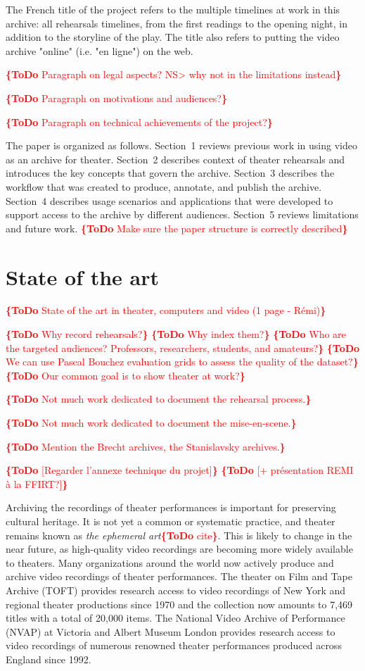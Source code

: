 \documentclass[conference]{IEEEtran}
\newcommand{\todo}[1]{\noindent\textcolor{red}{{\bf \{ToDo} #1{\bf \}}}}
\begin{document}
The French title of the project refers to the multiple timelines at work in this archive: all rehearsals timelines, from the first readings to the opening night, in addition to the storyline of the play. The title also refers to putting the video archive "online" (i.e. "en ligne") on the web.

\todo{Paragraph on legal aspects? NS> why not in the limitations instead} 

\todo{Paragraph on motivations and audiences?}

\todo{Paragraph on technical achievements of the project?}

The paper is organized as follows. Section~1 reviews previous work in using video as an archive for theater. Section~2 describes
context of theater rehearsals and introduces the key concepts that govern the archive. Section~3 describes the workflow that was
created to produce, annotate, and publish the archive. Section~4 describes usage scenarios and applications that were developed
to support access to the archive by different audiences. Section~5 reviews limitations and future work.
\todo{Make sure the paper structure is correctly described}


\section{State of the art}
\todo{State of the art in theater, computers and video (1 page - Rémi)}

\todo{Why record rehearsals?}
\todo{Why index them?}
\todo{Who are the targeted audiences? Professors, researchers, students, and amateurs?}
\todo{We can use Pascal Bouchez evaluation grids to assess the quality of the dataset?}
\todo{Our common goal is to show theater at work?}

\todo{Not much work dedicated to document the rehearsal process.}

\todo{Not much work dedicated to document the mise-en-scene.}

\todo{Mention the Brecht archives, the Stanislavsky archives.}

\todo{[Regarder l'annexe technique du projet]}
\todo{[+ présentation REMI à la FFIRT?]}

Archiving the recordings of theater performances is important for preserving  cultural heritage. 
It is not yet a common or systematic practice, and theater remains known as {\em the ephemeral art}\todo{cite}.
This is likely to change in the near future, as high-quality video recordings are becoming more widely
available to theaters.   Many organizations around the world now actively produce and
archive video recordings of theater performances. The theater on Film and Tape Archive
(TOFT) provides research access to video recordings of New York and regional theater productions
since 1970 and the collection now amounts to 7,469 titles with a total of 20,000 items. 
The National Video Archive of Performance (NVAP) at Victoria and Albert Museum London
provides research access to video recordings of numerous renowned theater performances produced
across England since 1992. 
\end{document}
